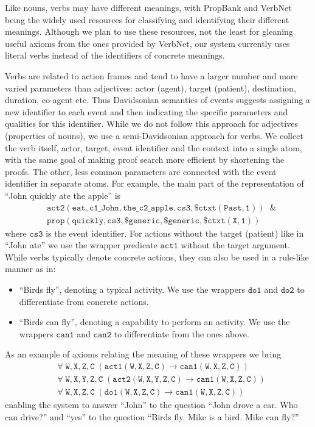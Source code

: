 \documentclass[runningheads]{llncs}
\begin{document}
Like nouns, verbs may have different meanings, with PropBank \cite{kingsbury2002treebank} and VerbNet \cite{schuler2006verbnet} being the widely used resources for 
classifying and identifying their different meanings. Although we plan to use these resources, not the least for gleaning useful axioms from
the ones provided by VerbNet, our system currently uses literal verbs instead of the identifiers of concrete meanings.

Verbs are related to action frames and tend to have a larger number and more varied parameters than adjectives: actor (agent), target (patient), destination,
duration, co-agent etc. Thus Davidsonian semantics of events \cite{maienborn2011event} suggests assigning a new identifier to each event
and then indicating the specific parameters and qualities for this identifier. While we do not follow this approach for adjectives (properties of nouns),
we use a semi-Davidsonian approach for verbs. We collect the verb itself, actor, target, event identifier and the context into a single atom, with
the same goal of making proof search more efficient by shortening the proofs. The other, less common parameters are connected with the 
event identifier in separate atoms. For example, the main part of the representation of ``John quickly ate the apple'' is 
\begin{align*}
  &\mathtt{act2(eat,c1\_John,the\_c2\_apple,cs3,\$ctxt(Past,1))\; \; \&}\\
  &\mathtt{prop(quickly,cs3,\$generic,\$generic,\$ctxt(X,1))}
\end{align*}
where $\mathtt{cs3}$ is the event identifier. For actions without the target (patient) like in ``John ate'' we use the wrapper predicate $\mathtt{act1}$
without the target argument.
While verbs typically denote concrete actions, they can also be used in a rule-like manner as in: 
\begin{itemize}
\item ``Birds fly'', denoting a typical activity. We use the wrappers $\mathtt{do1}$ and $\mathtt{do2}$ to differentiate from concrete actions.
\item ``Birds can fly'', denoting a capability to perform an activity. We use the wrappers $\mathtt{can1}$ and $\mathtt{can2}$ to differentiate from the ones above.
\end{itemize}
As an example of axioms relating the meaning of these wrappers we bring
\begin{align*}
  &\mathtt{\forall \; W,X,Z,C \; (act1(W,X,Z,C) \rightarrow can1(W,X,Z,C))}\\
  &\mathtt{\forall \; W,X,Y,Z,C \; (act2(W,X,Y,Z,C) \rightarrow can1(W,X,Z,C))}\\
  &\mathtt{\forall \; W,X,Z,C \; (do1(W,X,Z,C) \rightarrow can1(W,X,Z,C))}
\end{align*}
enabling the system to answer ``John'' to the question ``John drove a car.  Who can drive?'' and ``yes'' to the question 
``Birds fly. Mike is a bird. Mike can fly?''
\end{document}
